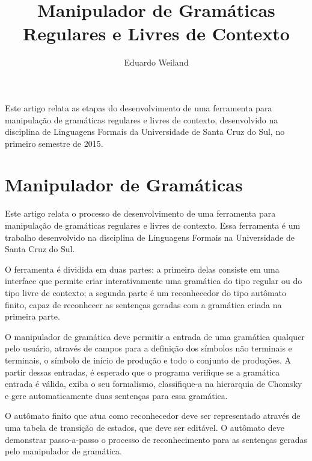 \documentclass[12pt]{article}
\title{Manipulador de Gramáticas Regulares e Livres de Contexto}
\author{Eduardo Weiland\inst{1}}
\begin{document}
\maketitle

\begin{resumo}
  Este artigo relata as etapas do desenvolvimento de uma ferramenta para manipulação de gramáticas regulares e livres
  de contexto, desenvolvido na disciplina de Linguagens Formais da Universidade de Santa Cruz do Sul, no primeiro
  semestre de 2015.
\end{resumo}


\section{Manipulador de Gramáticas}

Este artigo relata o processo de desenvolvimento de uma ferramenta para manipulação de gramáticas regulares e livres de
contexto. Essa ferramenta é um trabalho desenvolvido na disciplina de Linguagens Formais na Universidade de Santa Cruz
do Sul.

O ferramenta é dividida em duas partes: a primeira delas consiste em uma interface que permite criar interativamente uma
gramática do tipo regular ou do tipo livre de contexto; a segunda parte é um reconhecedor do tipo autômato finito,
capaz de reconhecer as sentenças geradas com a gramática criada na primeira parte.

O manipulador de gramática deve permitir a entrada de uma gramática qualquer pelo usuário, através de campos para a
definição dos símbolos não terminais e terminais, o símbolo de início de produção e todo o conjunto de produções. A
partir dessas entradas, é esperado que o programa verifique se a gramática entrada é válida, exiba o seu formalismo,
classifique-a na hierarquia de Chomsky e gere automaticamente duas sentenças para essa gramática.

O autômato finito que atua como reconhecedor deve ser representado através de uma tabela de transição de estados, que
deve ser editável. O autômato deve demonstrar passo-a-passo o processo de reconhecimento para as sentenças geradas pelo
manipulador de gramática.

\end{document}
